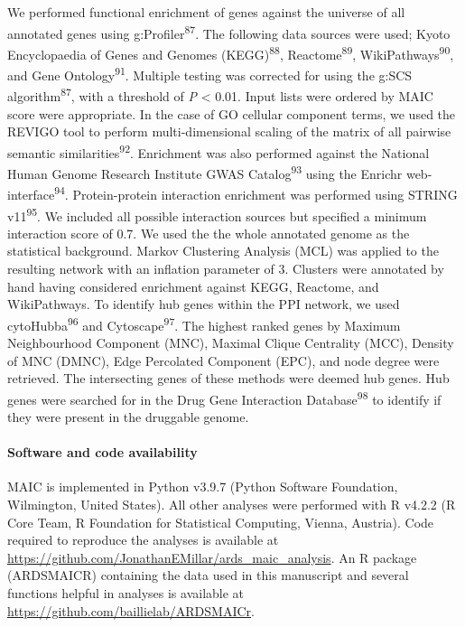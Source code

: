 \documentclass[
  11,
  a4paper,
]{article}
\let\oldparagraph\paragraph
\renewcommand{\paragraph}[1]{\oldparagraph{#1}\mbox{}}
\begin{document}
We performed functional enrichment of genes against the universe of all
annotated genes using g:Profiler\textsuperscript{87}. The following data
sources were used; Kyoto Encyclopaedia of Genes and Genomes
(KEGG)\textsuperscript{88}, Reactome\textsuperscript{89},
WikiPathways\textsuperscript{90}, and Gene Ontology\textsuperscript{91}.
Multiple testing was corrected for using the g:SCS
algorithm\textsuperscript{87}, with a threshold of \emph{P} \textless{}
0.01. Input lists were ordered by MAIC score were appropriate. In the
case of GO cellular component terms, we used the REVIGO tool to perform
multi-dimensional scaling of the matrix of all pairwise semantic
similarities\textsuperscript{92}. Enrichment was also performed against
the National Human Genome Research Institute GWAS
Catalog\textsuperscript{93} using the Enrichr
web-interface\textsuperscript{94}. Protein-protein interaction
enrichment was performed using STRING v11\textsuperscript{95}. We
included all possible interaction sources but specified a minimum
interaction score of 0.7. We used the the whole annotated genome as the
statistical background. Markov Clustering Analysis (MCL) was applied to
the resulting network with an inflation parameter of 3. Clusters were
annotated by hand having considered enrichment against KEGG, Reactome,
and WikiPathways. To identify hub genes within the PPI network, we used
cytoHubba\textsuperscript{96} and Cytoscape\textsuperscript{97}. The
highest ranked genes by Maximum Neighbourhood Component (MNC), Maximal
Clique Centrality (MCC), Density of MNC (DMNC), Edge Percolated
Component (EPC), and node degree were retrieved. The intersecting genes
of these methods were deemed hub genes. Hub genes were searched for in
the Drug Gene Interaction Database\textsuperscript{98} to identify if
they were present in the druggable genome.

\hypertarget{software-and-code-availability}{%
\paragraph{Software and code
availability}\label{software-and-code-availability}}

MAIC is implemented in Python v3.9.7 (Python Software Foundation,
Wilmington, United States). All other analyses were performed with R
v4.2.2 (R Core Team, R Foundation for Statistical Computing, Vienna,
Austria). Code required to reproduce the analyses is available at
\url{https://github.com/JonathanEMillar/ards_maic_analysis}. An R
package (ARDSMAICR) containing the data used in this manuscript and
several functions helpful in analyses is available at
\url{https://github.com/baillielab/ARDSMAICr}.
\end{document}
